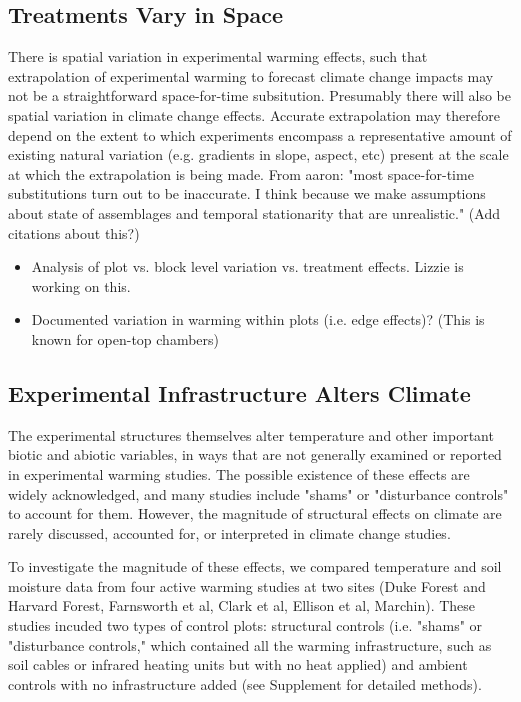\documentclass{article}
\begin{document}
\subsection {Treatments Vary in Space}
There is spatial variation in experimental warming effects, such that extrapolation of experimental warming to forecast climate change impacts may not be a straightforward space-for-time subsitution. Presumably there will also be spatial variation in climate change effects.  Accurate extrapolation may therefore depend on the extent to which experiments encompass a representative amount of existing natural variation (e.g. gradients in slope, aspect, etc) present at the scale at which the extrapolation is being made. From aaron: "most space-for-time substitutions turn out to be inaccurate. I think because we make assumptions about state of assemblages and temporal stationarity that are unrealistic." (Add citations about this?)
\begin{itemize}
\item Analysis of plot vs. block level variation vs. treatment effects. Lizzie is working on this.
\item Documented variation in warming within plots (i.e. edge effects)? (This is known for open-top chambers)
\end{itemize}

\subsection {Experimental Infrastructure Alters Climate}
The experimental structures themselves alter temperature and other important biotic and abiotic variables, in ways that are not generally examined or reported in experimental warming studies. The possible existence of these effects are widely acknowledged, and many studies include "shams" or "disturbance controls" to account for them. However, the magnitude of structural effects on climate are rarely discussed, accounted for, or interpreted in climate change studies.
\par To investigate the magnitude of these effects, we compared temperature and soil moisture data from four active warming studies at two sites (Duke Forest and Harvard Forest, Farnsworth et al, Clark et al, Ellison et al, Marchin). These studies incuded two types of control plots: structural controls (i.e. "shams" or "disturbance controls," which contained all the warming infrastructure, such as soil cables or infrared heating units but with no heat applied) and ambient controls with no infrastructure added (see Supplement for detailed methods).  
\end{document}

